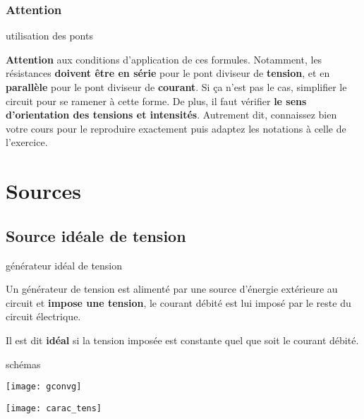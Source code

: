 \documentclass[../main/main.tex]{subfiles}
\begin{document}
\subsubsection{Attention}
\begin{ror}[label=impo:ponts]{utilisation des ponts}

    \textbf{Attention} aux conditions d'application de ces formules. Notamment,
    les résistances \textbf{doivent être en série} pour le pont diviseur de
    \textbf{tension}, et en \textbf{parallèle} pour le pont diviseur de
    \textbf{courant}. Si ça n'est pas le cas, simplifier le circuit pour se
    ramener à cette forme. De plus, il faut vérifier \textbf{le sens
    d'orientation des tensions et intensités}. Autrement dit, connaissez bien
    votre cours pour le reproduire exactement puis adaptez les notations à celle
    de l'exercice.
    
\end{ror}

\section{Sources}
\subsection{Source idéale de tension}

\begin{tcbraster}[raster columns=2, raster equal height=rows]
    \begin{defi}[label=def:gentens]{générateur idéal de tension}

        Un générateur de tension est alimenté par une source d'énergie
        extérieure au circuit et \textbf{impose une tension}, le courant débité
        est lui imposé par le reste du circuit électrique.

        \tcblower

        Il est dit \textbf{idéal} si la tension imposée est constante quel que
        soit le courant débité.
    \end{defi}
    \begin{exem}[label=exem:gentens, sidebyside, righthand width=.25\linewidth]
        {schémas}
        \begin{center}
            \texttt{[image: gconvg]}
        \end{center}
        \tcblower
        \begin{center}
            \texttt{[image: carac\_tens]}
        \end{center}
    \end{exem}
\end{tcbraster}
\end{document}
